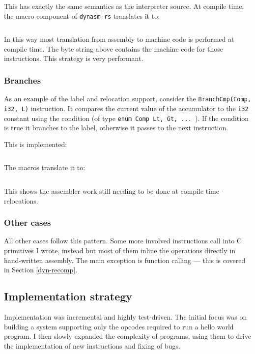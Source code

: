 This has exactly the same semantics as the interpreter source. At compile time, the macro component
of \texttt{dynasm-rs} translates it to:

\inputminted{rust}{snippets/add_comp.rs}

In this way most translation from assembly to machine code is performed at compile time. The byte
string above contains the machine code for those instructions. This strategy is very performant.

\subsubsection{Branches}

As an example of the label and relocation support, consider the \texttt{BranchCmp(Comp, i32, L)}
instruction. It
compares the current value of the accumulator to the \texttt{i32} constant using the condition (of
type \texttt{enum Comp {Lt, Gt, ... }}). If the condition is true it branches to the label,
otherwise it passes to the next instruction.

This is implemented:

\inputminted{rust}{snippets/branchcmp.rs}

The macros translate it to:

\inputminted{rust}{snippets/branchcmp_comp.rs}

This shows the assembler work still needing to be done at compile time - relocations.

\subsubsection{Other cases}

All other cases follow this pattern. Some more involved instructions call into C primitives
I wrote, instead but most of them inline the operations directly in hand-written assembly. The main
exception is function calling --- this is covered in Section \ref{dyn-recomp}.

\subsection{Implementation strategy}

Implementation was incremental and highly test-driven. The initial focus was on building a system
supporting only the opcodes required to run a hello world program. I then slowly expanded the
complexity of programs, using them to drive the implementation of new instructions and fixing of
bugs.


